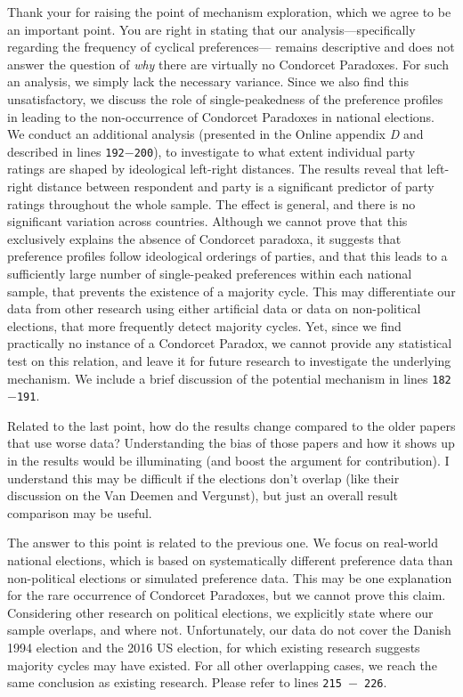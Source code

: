 \documentclass[a4paper, 12pt]{scrartcl}
\theoremstyle{break}
\newenvironment{changes}{\par\color{violet}\par\addvspace{\baselineskip}}{\par\addvspace{\baselineskip}}
\begin{document}
Thank your for raising the point of mechanism exploration, which we agree to be an important point. You are right in stating that our analysis—specifically regarding the frequency of cyclical preferences— remains descriptive and does not answer the question of \textit{why} there are virtually no Condorcet Paradoxes. For such an analysis, we simply lack the necessary variance. Since we also find this unsatisfactory, we discuss the role of single-peakedness of the preference profiles in leading to the non-occurrence of Condorcet Paradoxes in national elections. We conduct an additional analysis (presented in the Online appendix \textit{D }and described in lines \texttt{192$-$200}), to investigate to what extent individual party ratings are shaped by ideological left-right distances. The results reveal that left-right distance between respondent and party is a significant predictor of party ratings throughout the whole sample. The effect is general, and there is no significant variation across countries. Although we cannot prove that this exclusively explains the absence of Condorcet paradoxa, it suggests that preference profiles follow ideological orderings of parties, and that this leads to a sufficiently large number of single-peaked preferences within each national sample, that prevents the existence of a majority cycle. This may differentiate our data from other research using either artificial data or data on non-political elections, that more frequently detect majority cycles. Yet, since we find practically no instance of a Condorcet Paradox, we cannot provide any statistical test on this relation, and leave it for future research to investigate the underlying mechanism. We include a brief discussion of the potential mechanism in lines \texttt{182$-$191}.

\begin{changes}
	Related to the last point, how do the results change compared to the older papers that use worse data? Understanding the bias of those papers and how it shows up in the results would be illuminating (and boost the argument for contribution). I understand this may be difficult if the elections don’t overlap (like their discussion on the Van	Deemen and Vergunst), but just an overall result comparison may be useful.
\end{changes}
The answer to this point is related to the previous one. We focus on real-world national elections, which is based on systematically different preference data than non-political elections or simulated preference data. This may be one explanation for the rare occurrence of Condorcet Paradoxes, but we cannot prove this claim. Considering other research on political elections, we explicitly state where our sample overlaps, and where not. Unfortunately, our data do not cover the Danish 1994 election and the 2016 US election, for which existing research suggests majority cycles may have existed. For all other overlapping cases, we reach the same conclusion as existing research. Please refer to lines \texttt{215 $-$ 226}.
\end{document}
